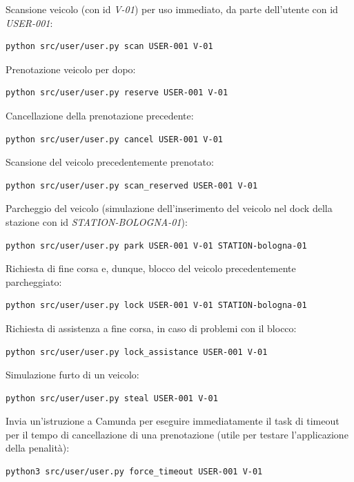 Scansione veicolo (con id \textit{V-01}) per uso immediato, da parte dell'utente
con id \textit{USER-001}:
\begin{lstlisting}[language=Bash]
	python src/user/user.py scan USER-001 V-01
\end{lstlisting}

Prenotazione veicolo per dopo:
\begin{lstlisting}[language=Bash]
	python src/user/user.py reserve USER-001 V-01
\end{lstlisting}

Cancellazione della prenotazione precedente:
\begin{lstlisting}[language=Bash]
	python src/user/user.py cancel USER-001 V-01
\end{lstlisting}

Scansione del veicolo precedentemente prenotato:
\begin{lstlisting}[language=Bash]
	python src/user/user.py scan_reserved USER-001 V-01
\end{lstlisting}

Parcheggio del veicolo (simulazione dell'inserimento del veicolo nel dock della
stazione con id \mbox{\textit{STATION-BOLOGNA-01}}):
\begin{lstlisting}[language=Bash]
	python src/user/user.py park USER-001 V-01 STATION-bologna-01
\end{lstlisting}

Richiesta di fine corsa e, dunque, blocco del veicolo precedentemente
parcheggiato:
\begin{lstlisting}[language=Bash]
	python src/user/user.py lock USER-001 V-01 STATION-bologna-01
\end{lstlisting}

Richiesta di assistenza a fine corsa, in caso di problemi con il blocco:
\begin{lstlisting}[language=Bash]
	python src/user/user.py lock_assistance USER-001 V-01
\end{lstlisting}

Simulazione furto di un veicolo:
\begin{lstlisting}[language=Bash]
	python src/user/user.py steal USER-001 V-01
\end{lstlisting}

Invia un'istruzione a Camunda per eseguire immediatamente il task di timeout
per il tempo di cancellazione di una prenotazione (utile per testare
l'applicazione della penalità):
\begin{lstlisting}[language=Bash]
	python3 src/user/user.py force_timeout USER-001 V-01
\end{lstlisting}


